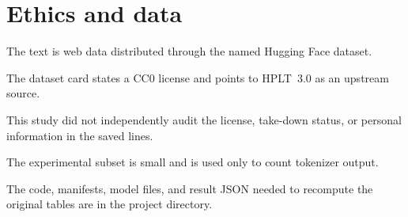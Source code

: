 \documentclass[10pt,twocolumn]{article}
\begin{document}
\section*{Ethics and data}

The text is web data distributed through the named
Hugging Face dataset.

The dataset card states a CC0 license and points to
HPLT~3.0 as an upstream source.

This study did not independently audit the license,
take-down status, or personal information in the
saved lines.

The experimental subset is small and is used only
to count tokenizer output.

The code, manifests, model files, and result JSON
needed to recompute the original tables are in the
project directory.


\FloatBarrier
\balance

\end{document}
